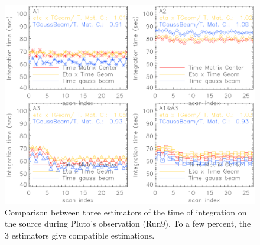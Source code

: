 \begin{figure}
\begin{center}
\includegraphics[clip, angle=0, scale =0.8]{Figures/Pluto_time_of_integration.eps}
\caption[Time of integration]{Comparison between three estimators of the time of integration on the
  source during Pluto's observation (Run9). To a few percent, the 3 estimators
  give compatible estimations.}
\label{fig:time_comparison}
\end{center}
\end{figure}







